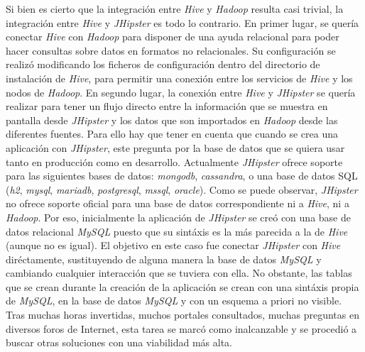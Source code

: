 \par
Si bien es cierto que la integración entre \textit{Hive} y \textit{Hadoop} resulta casi trivial, la integración entre \textit{Hive} y \textit{JHipster} es todo lo contrario. En primer lugar, se quería conectar \textit{Hive} con \textit{Hadoop} para disponer de una ayuda relacional para poder hacer consultas sobre datos en formatos no relacionales. Su configuración se realizó modificando los ficheros de configuración dentro del directorio de instalación de \textit{Hive}, para permitir una conexión entre los servicios de \textit{Hive} y los nodos de \textit{Hadoop}. En segundo lugar, la conexión entre \textit{Hive} y \textit{JHipster} se quería realizar para tener un flujo directo entre la información que se muestra en pantalla desde \textit{JHipster} y los datos que son importados en \textit{Hadoop} desde las diferentes fuentes. Para ello hay que tener en cuenta que cuando se crea una aplicación con \textit{JHipster}, este pregunta por la base de datos que se quiera usar tanto en producción como en desarrollo. Actualmente \textit{JHipster} ofrece soporte para las siguientes bases de datos: \textit{\gls{mongodb}}, \textit{\gls{cassandra}}, o una base de datos SQL (\textit{\gls{h2}}, \textit{\gls{mysql}}, \textit{\gls{mariadb}}, \textit{\gls{postgresql}}, \textit{\gls{mssql}}, \textit{\gls{oracle}}).
Como se puede observar, \textit{JHipster} no ofrece soporte oficial para una base de datos correspondiente ni a \textit{Hive}, ni a \textit{Hadoop}. Por eso, inicialmente la aplicación de \textit{JHipster} se creó con una base de datos relacional \textit{MySQL} puesto que su sintáxis es la más parecida a la de \textit{Hive} (aunque no es igual). El objetivo en este caso fue conectar \textit{JHipster} con \textit{Hive} diréctamente, sustituyendo de alguna manera la base de datos \textit{MySQL} y cambiando cualquier interacción que se tuviera con ella. No obstante, las tablas que se crean durante la creación de la aplicación se crean con una sintáxis propia de \textit{MySQL}, en la base de datos \textit{MySQL} y con un esquema a priori no visible. Tras muchas horas invertidas, muchos portales consultados, muchas preguntas en diversos foros de Internet, esta tarea se marcó como inalcanzable y se procedió a buscar otras soluciones con una viabilidad más alta. 


\bigskip
\par
